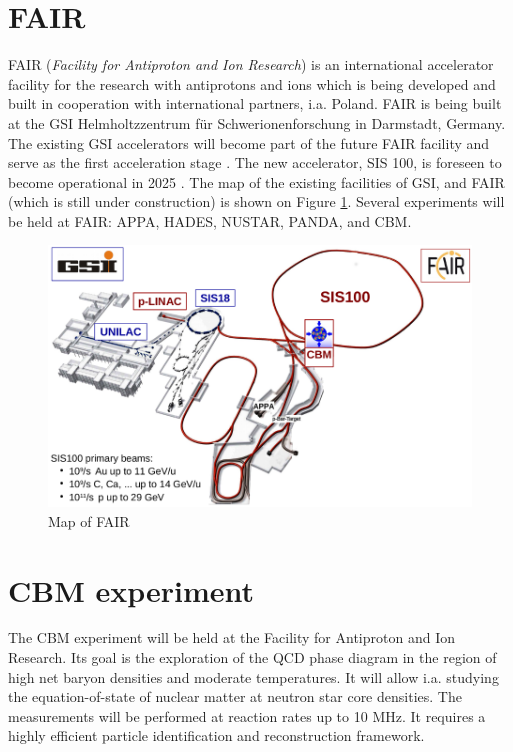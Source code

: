 \pagestyle{fancy}
\section{FAIR}\thispagestyle{fancy}
FAIR (\emph{Facility for Antiproton and Ion Research}) \cite{fair} is an international accelerator facility for the research with antiprotons and ions which is being developed and built in cooperation with international partners, i.a. Poland. FAIR is being built at the GSI Helmholtzzentrum für Schwerionenforschung in Darmstadt, Germany. The existing GSI accelerators will become part of the future FAIR facility and serve as the first acceleration stage \cite{fair}. The new accelerator, SIS 100, is  foreseen to become
operational in 2025 \cite{progress report}. The map of the existing facilities of GSI, and FAIR (which is still under construction) is shown on Figure \ref{fair map}. Several experiments will be held at FAIR: APPA, HADES, NUSTAR, PANDA, and CBM.
\begin{figure}[H]
    \centering
    \includegraphics[width=.7\textwidth]{img/fair map.png}
    \caption{Map of FAIR\cite{fair}}
    \label{fair map}
\end{figure}
\section{CBM experiment}
The CBM experiment will be held at the Facility for Antiproton and Ion Research. Its goal is the exploration of the QCD phase diagram in the region of high net baryon densities and moderate temperatures. It will allow i.a. studying the equation-of-state of nuclear matter at neutron star core densities. The measurements will be performed at reaction rates up to 10 MHz. It requires a highly efficient particle identification and reconstruction framework. \cite{cbm-experiment}
